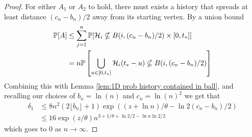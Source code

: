 \begin{proof}
		For either $A_1$ or $A_2$ to hold, there must exists a history that spreads at least distance $(c_n - b_n) / 2$ away from its starting vertex. 
		By a union bound
		\begin{align}
			\mathbb{P}[A] &\leq \sum_{j = 1}^n \mathbb{P}[\mathcal{H}_i \nsubseteq B(i, (c_n - b_n)/2) \times [0, t_*]]\\
				&= n \mathbb{P}\left[\bigcup_{u \in [0, t_*]}\mathcal{H}_i(t_* - u) \nsubseteq B(i, (c_n - b_n)/2)\right]
		\end{align}
		Combining this with Lemma \ref{lem:1D prob history contained in ball}, and recalling our choices of $b_n = \ln(n)$ and $c_n = \ln(n)^2$ we get that
		\begin{align}
			\delta_1 &\leq 8n^2(2\lfloor b_n\rfloor + 1) \exp\left((z + \ln n)/\theta - \ln 2(c_n - b_n) /2 \right)\\
			&\leq 16 \exp(z/\theta) n^{3+ 1/\theta + \ln2/2 -\ln n \ln 2/ 2}
		\end{align}
		which goes to $0$ as $n \rightarrow \infty$.
	\end{proof}

